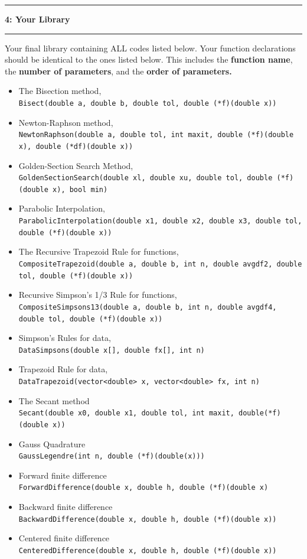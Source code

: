 \documentclass[11pt]{article}
\newcommand\question[2]{\vspace{.25in}\hrule\textbf{#1: #2}\vspace{.5em}\hrule\vspace{.10in}}
\begin{document}
\newpage
\question{4}{Your Library}
Your final library containing ALL codes listed below. Your function declarations should be identical to the ones listed below. This includes the \textbf{function name}, the \textbf{number of parameters}, and the\textbf{ order of parameters.} 
\begin{itemize}
	\item The Bisection method, \\\texttt{Bisect(double a, double b, double tol, double (*f)(double x))}
	\item Newton-Raphson method, \\\texttt{NewtonRaphson(double a, double tol, int maxit, double (*f)(double x), double (*df)(double x))}
	\item Golden-Section Search Method, \\\texttt{GoldenSectionSearch(double xl, double xu, double tol, double (*f)(double x), bool min)}
	\item Parabolic Interpolation, \\\texttt{ParabolicInterpolation(double x1, double x2, double x3, double tol, double (*f)(double x))}
	\item The Recursive Trapezoid Rule for functions, \\\texttt{CompositeTrapezoid(double a, double b, int n, double avgdf2, double tol, double (*f)(double x))}
	\item Recursive Simpson's 1/3 Rule for functions, \\\texttt{CompositeSimpsons13(double a, double b, int n, double avgdf4, double tol, double (*f)(double x))}
	\item Simpson's Rules for data, \\\texttt{DataSimpsons(double x[], double fx[], int n)}
	\item Trapezoid Rule for data, \\\texttt{DataTrapezoid(vector<double> x, vector<double> fx, int n)}
	\item The Secant method \\\texttt{Secant(double x0, double x1, double tol, int maxit, double(*f)(double x))}
	\item Gauss Quadrature \\\texttt{GaussLegendre(int n, double (*f)(double(x)))}
	\item Forward finite difference \\\texttt{ForwardDifference(double x, double h, double (*f)(double x)}
\end{itemize}
\newpage
\begin{itemize}
	\item Backward finite difference \\\texttt{BackwardDifference(double x, double h, double (*f)(double x))}
	\item Centered finite difference \\\texttt{CenteredDifference(double x, double h, double (*f)(double x))}
\end{itemize}
\end{document}
